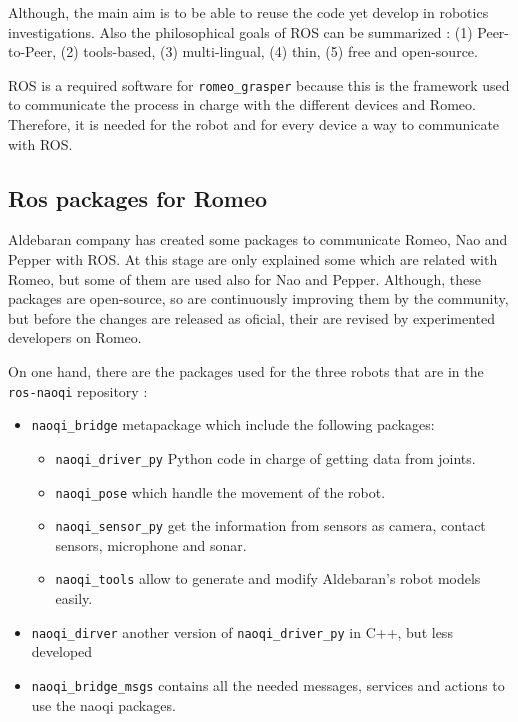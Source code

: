 \documentclass[12pt,a4paper,final,twoside,openright]{report}
\begin{document}
Although, the main aim is to be able to reuse the code yet develop in robotics investigations. Also the philosophical goals of ROS can be summarized \cite{Quigley}: (1) Peer-to-Peer, (2) tools-based, (3) multi-lingual, (4) thin, (5) free and open-source. 

ROS is a required software for \texttt{romeo\_grasper} because this is the framework used to communicate the process in charge with the different devices and Romeo. Therefore, it is needed for the robot and for every device a way to communicate with ROS.

\subsection{Ros packages for Romeo}
\label{sec:romeo_ros}

Aldebaran company has created some packages to communicate Romeo, Nao and Pepper with ROS. At this stage are only explained some which are related with Romeo, but some of them are used also for Nao and Pepper. Although, these packages are open-source, so are continuously improving them by the community, but before the changes are released as oficial, their are revised by experimented developers on Romeo.

On one hand, there are the packages used for the three robots that are in the \texttt{ros-naoqi} repository \cite{ros-naoqi}:
\begin{itemize}
\item \texttt{naoqi\_bridge} metapackage which include the following packages:
\begin{itemize}
\item \texttt{naoqi\_driver\_py} Python code in charge of getting data from joints.
\item \texttt{naoqi\_pose} which handle the movement of the robot.
\item \texttt{naoqi\_sensor\_py} get the information from sensors as camera, contact sensors, microphone and sonar.
\item \texttt{naoqi\_tools} allow to generate and modify Aldebaran's robot models easily.
\end{itemize}
\item \texttt{naoqi\_dirver} another version of \texttt{naoqi\_driver\_py} in C++, but less developed 
\item \texttt{naoqi\_bridge\_msgs} contains all the needed messages, services and actions to use the naoqi packages.
\end{itemize}
\end{document}
